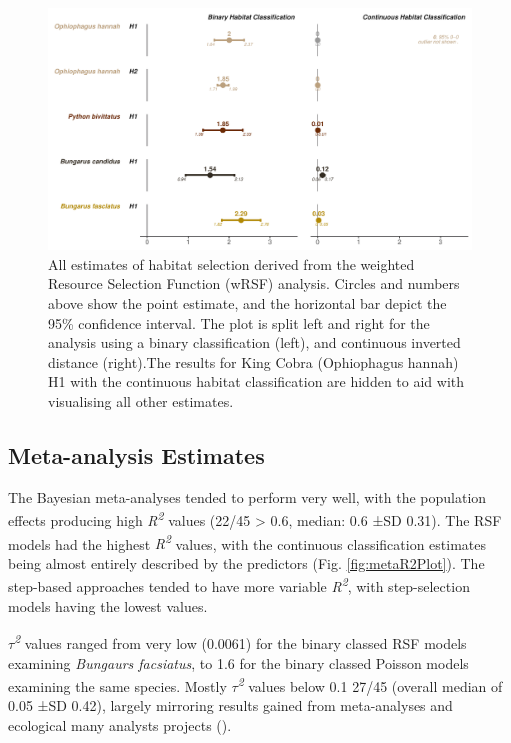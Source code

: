 \documentclass[10pt,a4paper]{article}
\begin{document}
\begin{figure}
\includegraphics[width=1\linewidth]{../../figures/specCurve_wrsf} \caption{All estimates of habitat selection derived from the weighted Resource Selection Function (wRSF) analysis. Circles and numbers above show the point estimate, and the horizontal bar depict the 95\% confidence interval. The plot is split left and right for the analysis using a binary classification (left), and continuous inverted distance (right).The results for King Cobra (Ophiophagus hannah) H1 with the continuous habitat classification are hidden to aid with visualising all other estimates.}\label{fig:specCurveWrsf}
\end{figure}

\subsection{Meta-analysis Estimates}\label{meta-analysis-estimates}

The Bayesian meta-analyses tended to perform very well, with the population effects producing high \emph{R\textsuperscript{2}} values (22/45 \textgreater{} 0.6, median: 0.6 ±SD 0.31).
The RSF models had the highest \emph{R\textsuperscript{2}} values, with the continuous classification estimates being almost entirely described by the predictors (Fig. \ref{fig:metaR2Plot}).
The step-based approaches tended to have more variable \emph{R\textsuperscript{2}}, with step-selection models having the lowest values.

\emph{\(\tau\)\textsuperscript{2}} values ranged from very low (0.0061) for the binary classed RSF models examining \emph{Bungaurs facsiatus}, to 1.6 for the binary classed Poisson models examining the same species.
Mostly \emph{\(\tau\)\textsuperscript{2}} values below 0.1 27/45 (overall median of 0.05 ±SD 0.42), largely mirroring results gained from meta-analyses and ecological many analysts projects ().
\end{document}
